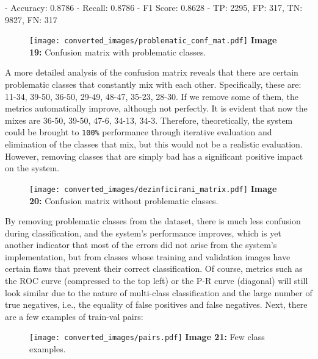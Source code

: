\documentclass{article}
\begin{document}
- Accuracy: 0.8786
- Recall: 0.8786
- F1 Score: 0.8628
- TP: 2295, FP: 317, TN: 9827, FN: 317

\begin{figure}[H]
    \centering
    \texttt{[image: converted\_images/problematic\_conf\_mat.pdf]}
    \textbf{Image 19:} Confusion matrix with problematic classes.
\end{figure}


\hspace*{1.00cm}A more detailed analysis of the confusion matrix \cite{geeksforgeeks_confusion_matrix} reveals that there are certain problematic classes that constantly mix with each other. Specifically, these are: 11-34, 39-50, 36-50, 29-49, 48-47, 35-23, 28-30. If we remove some of them, the metrics automatically improve, although not perfectly. It is evident that now the mixes are 36-50, 39-50, 47-6, 34-13, 34-3. Therefore, theoretically, the system could be brought to 
\texttt{100\%} performance through iterative evaluation and elimination of the classes that mix, but this would not be a realistic evaluation. However, removing classes that are simply bad has a significant positive impact on the system.

\begin{figure}[H]
    \centering
    \texttt{[image: converted\_images/dezinficirani\_matrix.pdf]}
    \textbf{Image 20:} Confusion matrix without problematic classes.
\end{figure}

\hspace*{1.00cm}By removing problematic classes from the dataset, there is much less confusion during classification, and the system's performance improves, which is yet another indicator that most of the errors did not arise from the system's implementation, but from classes whose training and validation images have certain flaws that prevent their correct classification. Of course, metrics such as the ROC curve (compressed to the top left) or the P-R curve (diagonal) will still look similar due to the nature of multi-class classification and the large number of true negatives, i.e., the equality of false positives and false negatives.
Next, there are a few examples of train-val pairs:
\begin{figure}[H]
    \centering
    \texttt{[image: converted\_images/pairs.pdf]}
    \textbf{Image 21:} Few class examples.
\end{figure}
\newpage
\end{document}
